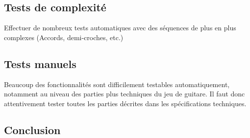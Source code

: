 \documentclass[12pt]{article}
\begin{document}
\subsection{Tests de complexité}
Effectuer de nombreux tests automatiques avec des séquences de plus en plus complexes (Accords, demi-croches, etc.)

\subsection{Tests manuels}
Beaucoup des fonctionnalités sont difficilement testables automatiquement, notamment au niveau des parties plus techniques du jeu de guitare. Il faut donc attentivement tester toutes les parties décrites dans les spécifications techniques.

\newpage
\subsection{Conclusion}
\end{document}
